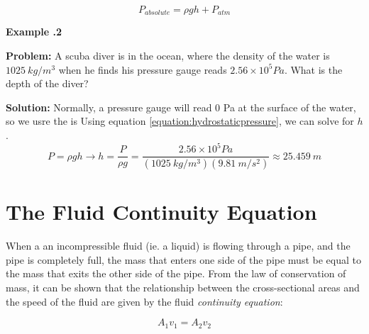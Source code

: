\begin{mdframed}[backgroundcolor=orange!20!white]
	\begin{equation}
		P_{absolute} = \rho g h + P_{atm}
		\label{equation:absolutepressure}
	\end{equation}
\end{mdframed}	


	\begin{mdframed}[backgroundcolor=blue!10!white]
	\begin{center}
		
		
		\textbf{Example \thesection.2}	
	\end{center}
	
	\textbf{Problem: } A scuba diver is in the ocean, where the density of the water is $\SI{1025}{kg/m^3}$ when he finds his pressure gauge reads $2.56 \times 10^5 \si{Pa}$.  What is the depth of the diver?  
	\vspace{0.1in}
	
	\textbf{Solution:} Normally, a pressure gauge will read 0 Pa at the surface of the water, so we usre the   is Using equation \ref{equation:hydrostaticpressure}, we can solve for $h$.  
	\begin{equation*}
		P = \rho g h  \longrightarrow h = \frac{P}{\rho g} = \frac{2.56 \times 10^5 \si{Pa}}{(\SI{1025}{kg/m^3})(\SI{9.81}{m/s^2})} \approx \SI{25.459}{m}
	\end{equation*}
	
	
\end{mdframed}
\vspace{0.1in}



\section{The Fluid Continuity Equation}

When a an incompressible fluid (ie. a liquid) is flowing through a pipe, and the pipe is completely full, the mass that enters one side of the pipe must be equal to the mass that exits the other side of the pipe.  From the law of conservation of mass, it can be shown that the relationship between the cross-sectional areas and the speed of the fluid are given by the fluid \textit{continuity equation}:
			\begin{mdframed}[backgroundcolor=orange!20!white]
	\begin{equation}
		A_1 v_1 = A_2 v_2
		\label{equation:fluidcontinuity}
	\end{equation}
\end{mdframed}	


